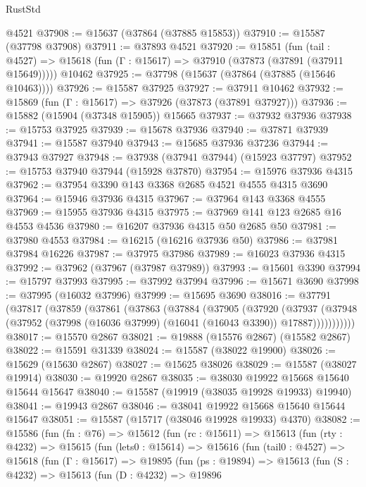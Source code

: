\begin{lexlean}{RustStd}
\begin{coremodule}
    @4521
@37908 := @15637 (@37864 (@37885 @15853))
@37910 := @15587 (@37798 @37908)
@37911 := @37893 @4521
@37920 := @15851
    (fun (tail : @4527) => @15618 (fun (Γ : @15617) => @37910 (@37873 (@37891 (@37911 @15649)))))
    @10462
@37925 := @37798 (@15637 (@37864 (@37885 (@15646 @10463))))
@37926 := @15587 @37925
@37927 := @37911 @10462
@37932 := @15869 (fun (Γ : @15617) => @37926 (@37873 (@37891 @37927)))
@37936 := @15882 (@15904 (@37348 @15905)) @15665
@37937 := @37932 @37936
@37938 := @15753 @37925
@37939 := @15678 @37936
@37940 := @37871 @37939
@37941 := @15587 @37940
@37943 := @15685 @37936 @37236
@37944 := @37943 @37927
@37948 := @37938 (@37941 @37944) (@15923 @37797)
@37952 := @15753 @37940 @37944 (@15928 @37870)
@37954 := @15976 @37936 @4315
@37962 := @37954 @3390 @143 @3368 @2685 @4521 @4555 @4315 @3690
@37964 := @15946 @37936 @4315
@37967 := @37964 @143 @3368 @4555
@37969 := @15955 @37936 @4315
@37975 := @37969 @141 @123 @2685 @16 @4553 @4536
@37980 := @16207 @37936 @4315 @50 @2685 @50
@37981 := @37980 @4553
@37984 := @16215 (@16216 @37936 @50)
@37986 := @37981 @37984 @16226
@37987 := @37975 @37986
@37989 := @16023 @37936 @4315
@37992 := @37962 (@37967 (@37987 @37989))
@37993 := @15601 @3390
@37994 := @15797 @37993
@37995 := @37992 @37994
@37996 := @15671 @3690
@37998 := @37995 (@16032 @37996)
@37999 := @15695 @3690
@38016 := @37791
    (@37817
      (@37859
        (@37861
          (@37863
            (@37884
              (@37905
                (@37920
                  (@37937
                    (@37948
                      (@37952 (@37998 (@16036 @37999) (@16041 (@16043 @3390)) @17887)))))))))))
@38017 := @15570 @2867
@38021 := @19888 (@15576 @2867) (@15582 @2867)
@38022 := @15591 @31339
@38024 := @15587 (@38022 @19900)
@38026 := @15629 (@15630 @2867)
@38027 := @15625 @38026
@38029 := @15587 (@38027 @19914)
@38030 := @19920 @2867
@38035 := @38030 @19922 @15668 @15640 @15644 @15647
@38040 := @15587 (@19919 (@38035 @19928 @19933) @19940)
@38041 := @19943 @2867
@38046 := @38041 @19922 @15668 @15640 @15644 @15647
@38051 := @15587 (@15717 (@38046 @19928 @19933) @4370)
@38082 := @15586
    (fun (fn : @76) =>
    @15612
      (fun (rc : @15611) =>
      @15613
        (fun (rty : @4232) =>
        @15615
          (fun (lets0 : @15614) =>
          @15616
            (fun (tail0 : @4527) =>
            @15618
              (fun (Γ : @15617) =>
              @19895
                (fun (ps : @19894) =>
                @15613
                  (fun (S : @4232) =>
                  @15613
                    (fun (D : @4232) =>
                    @19896

\end{coremodule}
\end{lexlean}
